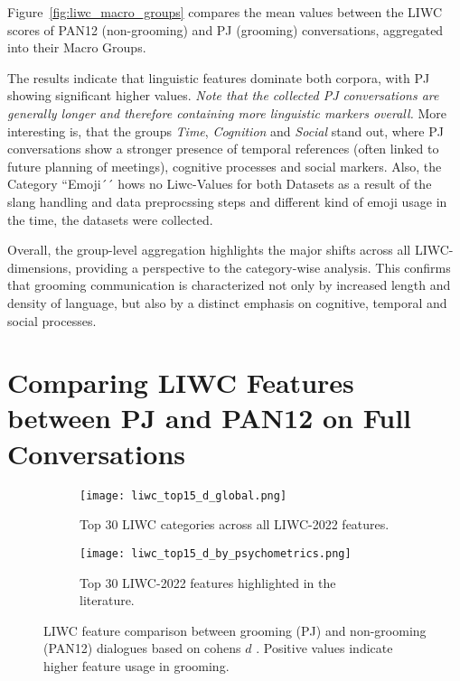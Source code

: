 Figure~\ref{fig:liwc_macro_groups} compares the mean values between the LIWC scores of PAN12 (non-grooming) and PJ (grooming) conversations, aggregated into their Macro Groups.

The results indicate that linguistic features dominate both corpora, with PJ showing significant higher values. \textit{Note that the collected PJ conversations are generally longer and therefore containing more linguistic markers overall.} More interesting is, that the groups \textit{Time}, \textit{Cognition} and \textit{Social} stand out, where PJ conversations show a stronger presence of temporal references (often linked to future planning of meetings), cognitive processes and social markers. Also, the Category ``Emoji´´ hows no Liwc-Values for both Datasets as a result of the slang handling and data preprocssing steps and different kind of emoji usage in the time, the datasets were collected.

Overall, the group-level aggregation highlights the major shifts across all LIWC-dimensions, providing a perspective to the category-wise analysis. This confirms that grooming communication is  characterized not only by increased length and density of language, but also by a distinct emphasis on cognitive, temporal and social processes.


\section{Comparing LIWC Features between PJ and PAN12 on Full Conversations} \label{sec:liwc_global_analysis}

\begin{figure}[ht]
    \centering
    \begin{subfigure}[t]{0.48\textwidth}
        \centering
        \texttt{[image: liwc\_top15\_d\_global.png]}
        \caption{Top 30 LIWC categories across all LIWC-2022 features.}
    \end{subfigure}
    \hfill
    \begin{subfigure}[t]{0.48\textwidth}
        \centering
        \texttt{[image: liwc\_top15\_d\_by\_psychometrics.png]}
        \caption{Top 30 LIWC-2022 features highlighted in the literature.}
    \end{subfigure}
    \caption[LIWC feature Comparison (PJ, PAN12) over Complete Conversations]{LIWC feature comparison between grooming (PJ) and non-grooming (PAN12) dialogues based on cohens $d$ \cite{cohen1988}. Positive values indicate higher feature usage in grooming.}
    \label{fig:liwc_global_analysis}
\end{figure}


